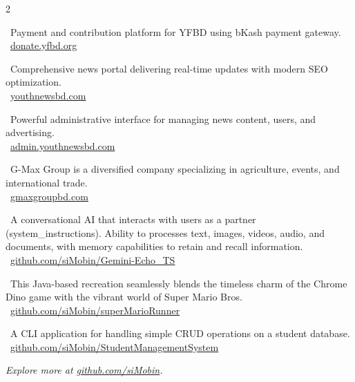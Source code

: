 \begin{paracol}{2}
    \switchcolumn

    \small \faChevronRight \ Payment and contribution platform for YFBD using bKash payment gateway. \\[0.5em]
    \small \faGlobe \ \href{https://donate.yfbd.org/}{donate.yfbd.org}

    \divider

    \small \faChevronRight \ Comprehensive news portal delivering real-time updates with modern SEO optimization. \\[0.5em]
    \small \faGlobe \ \href{https://youthnewsbd.com}{youthnewsbd.com}

    \divider

    \small \faChevronRight \ Powerful administrative interface for managing news content, users, and advertising. \\[0.5em]
    \small \faGlobe \ \href{https://admin.youthnewsbd.com}{admin.youthnewsbd.com}

    \divider

    \small \faChevronRight \ G-Max Group is a diversified company specializing in agriculture, events, and international trade. \\[0.5em]
    \small \faGlobe \ \href{https://gmaxgroupbd.com/}{gmaxgroupbd.com}

    \divider

    \small \faChevronRight \ A conversational AI that interacts with users as a \faVenus partner (system\_instructions). Ability to processes text, images, videos, audio, and documents, with memory capabilities to retain and recall information. \\[0.5em]
    \small \faGithub \ \href{https://github.com/siMobin/Gemini-Echo\_TS}{github.com/siMobin/Gemini-Echo\_TS}

    \divider

    \small \faChevronRight \ This Java-based recreation seamlessly blends the timeless charm of the Chrome Dino game with the vibrant world of Super Mario Bros. \\[0.5em]
    \small \faGithub \ \href{https://github.com/siMobin/superMarioRunner}{github.com/siMobin/superMarioRunner}

    \divider

    \small \faChevronRight \ A CLI application for handling simple CRUD operations on a student database. \\[0.5em]
    \small \faGithub \ \href{https://github.com/siMobin/StudentManagementSystem}{github.com/siMobin/StudentManagementSystem}

\end{paracol}

\vspace{4mm}
\centering \faFire \textit{Explore more at \href{https://github.com/siMobin/}{github.com/siMobin}.}\faFire
